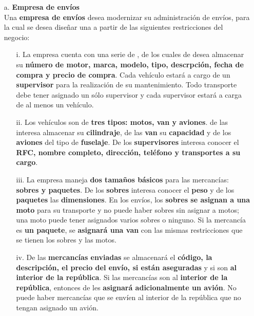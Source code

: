 \documentclass[letterpaper,11pt]{article}
\begin{document}
\begin{itemize}
    \item[a.] \textbf{Empresa de envíos} \\
    Una \textbf{empresa de envíos} desea modernizar su administración de envíos,
    para la cual se desea diseñar una  a partir de las
    siguientes restricciones del negocio:

    \begin{itemize}
        \item[i.] La empresa cuenta con una serie de ,
        de los cuales de desea almacenar su \textbf{número de motor, marca, modelo,
        tipo, descrpción, fecha de compra y precio de compra}. Cada vehículo estará
        a cargo de un \textbf{supervisor} para la realización de su mantenimiento.
        Todo transporte debe tener asignado un sólo supervisor y cada supervisor
        estará a carga de al menos un vehículo.

        \item[ii.] Los vehículos son de \textbf{tres tipos: motos, van y aviones}.
        de las  interesa almacenar su \textbf{cilindraje}, de las
        \textbf{van} su \textbf{capacidad} y de los \textbf{aviones} del tipo de
        \textbf{fuselaje}. De los \textbf{supervisores} interesa conocer el
        \textbf{RFC, nombre completo, dirección, teléfono y transportes a su cargo}.

        \item[iii.] La empresa maneja \textbf{dos tamaños básicos} para las
        mercancías: \textbf{sobres y paquetes}. De los \textbf{sobres} interesa
        conocer el \textbf{peso} y de los \textbf{paquetes} las \textbf{dimensiones}.
        En los envíos, los \textbf{sobres se asignan a una moto} para su
        transporte y no puede haber sobres sin asignar a motos; una moto puede tener
        asignados varios sobres o ninguno. Si la mercancía es \textbf{un paquete},
        se \textbf{asignará una van} con las mismas restricciones que se tienen los
        sobres y las motos.

        \item[iv.] De las \textbf{mercancías enviadas} se almacenará el
        \textbf{código, la descripción, el precio del envío, si están aseguradas} y
        si son \textbf{al interior de la república}. Si las mercancías son al
        \textbf{interior de la república}, entonces de les \textbf{asignará
        adicionalmente un avión}. No puede haber mercancías que se envíen al interior
        de la república que no tengan asignado un avión.


\end{itemize}
\end{itemize}
\end{document}
